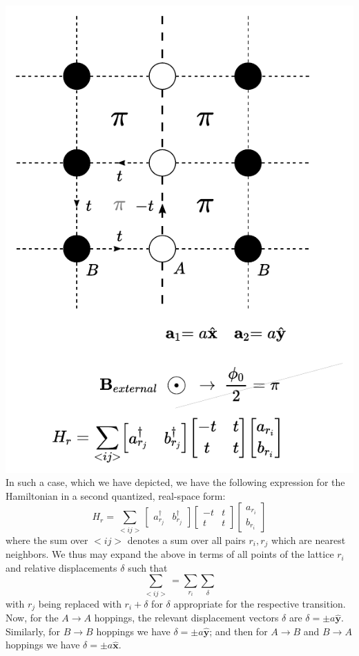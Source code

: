 \documentclass[10pt,a4paper]{article}\usepackage[]{graphicx}\usepackage[]{color}
\begin{document}
\begin{multicols}{2}
\includegraphics[scale=.7]{sqpi1nn.pdf}
In such a case, which we have depicted, we have the following expression for the Hamiltonian in a second quantized, real-space form:
$$
H_{r}=\sum_{<ij>}
\begin{bmatrix}
a^{\dagger}_{r_j} & b^{\dagger}_{r_j}
\end{bmatrix}
\begin{bmatrix}
-t & t\\
t & t 
\end{bmatrix}
\begin{bmatrix}
a_{r_i} \\ b_{r_i}
\end{bmatrix}
$$
where the sum over $<ij>$ denotes a sum over all pairs $r_i,r_j$ which are nearest neighbors. We thus may expand the above in terms of all points of the lattice $r_i$ and relative displacements $\delta$ such that
$$
\sum_{<ij>} = \sum_{r_i}\sum_{\delta}
$$
with $r_j$ being replaced with $r_i+\delta$ for $\delta$ appropriate for the respective transition. Now, for the $A\rightarrow A$ hoppings, the relevant displacement vectors $\delta$ are $\delta = \pm a\hat{\mathbf{y}}$. Similarly, for $B\rightarrow B$ hoppings we have $\delta = \pm a \hat{\mathbf{y}}$; and then for $A\rightarrow B$ and $B\rightarrow A$  hoppings we have $\delta = \pm a \hat{\mathbf{x}}$.


\end{multicols}
\end{document}
